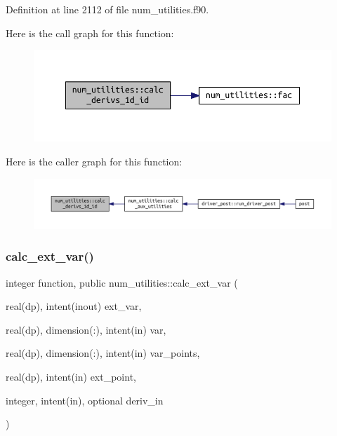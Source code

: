 Definition at line 2112 of file num\+\_\+utilities.\+f90.

Here is the call graph for this function\+:
\nopagebreak
\begin{figure}[H]
\begin{center}
\leavevmode
\includegraphics[width=350pt]{namespacenum__utilities_af2e9ffd7ce2f9391bf8b6f1c344fabca_cgraph}
\end{center}
\end{figure}
Here is the caller graph for this function\+:
\nopagebreak
\begin{figure}[H]
\begin{center}
\leavevmode
\includegraphics[width=350pt]{namespacenum__utilities_af2e9ffd7ce2f9391bf8b6f1c344fabca_icgraph}
\end{center}
\end{figure}
\mbox{\label{namespacenum__utilities_a2d5d9c66db19fb6edeeb50db6182397f}} 
\subsubsection{\texorpdfstring{calc\+\_\+ext\+\_\+var()}{calc\_ext\_var()}}
{\footnotesize\ttfamily integer function, public num\+\_\+utilities\+::calc\+\_\+ext\+\_\+var (\begin{DoxyParamCaption}\item[{real(dp), intent(inout)}]{ext\+\_\+var,  }\item[{real(dp), dimension(\+:), intent(in)}]{var,  }\item[{real(dp), dimension(\+:), intent(in)}]{var\+\_\+points,  }\item[{real(dp), intent(in)}]{ext\+\_\+point,  }\item[{integer, intent(in), optional}]{deriv\+\_\+in }\end{DoxyParamCaption})}



